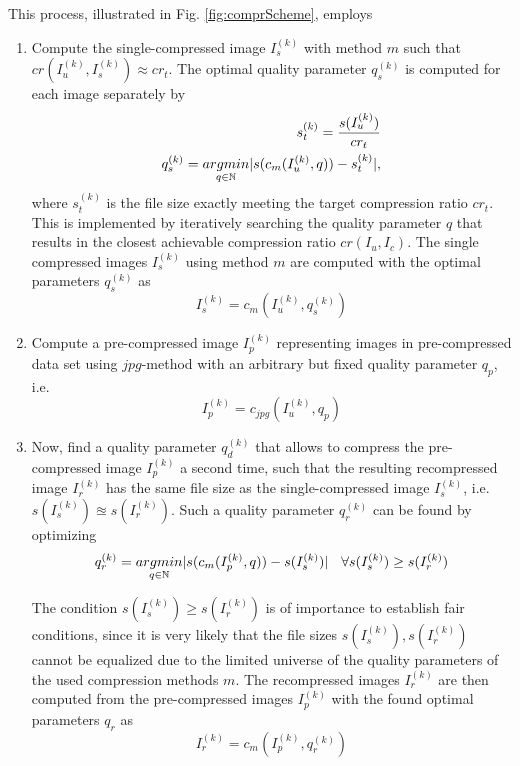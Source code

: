 \documentclass[10pt,twocolumn,letterpaper]{article}
\begin{document}
This process, illustrated in Fig. \ref{fig:comprScheme}, employs
\begin{enumerate}
	\item Compute the single-compressed image $I_s^{(k)}$ with method $m$ such that $cr(I_u^{(k)}, I_s^{(k)}) \approx cr_t$. The optimal quality parameter $q_s^{(k)}$ is computed for each image separately by
	\begin{eqnarray}
	\small
	s_t^{(k)} = \frac{s(I_u^{(k)})}{cr_t} \\
	q_s^{(k)} = \underset{q \in \mathbb{N}}{argmin}|s(c_m(I_u^{(k)},q)) - s_t^{(k)}|,
	\end{eqnarray} where $s_t^{(k)}$ is the file size exactly meeting the target compression ratio $cr_t$. This is implemented by iteratively searching the quality parameter $q$ that results in the closest achievable compression ratio $cr(I_u, I_c)$. The single compressed images $I_s^{(k)}$ using method $m$ are computed with the optimal parameters $ q_s^{(k)}$ as
	\begin{equation}
	I_s^{(k)} = c_m(I_u^{(k)}, q_s^{(k)})
	\end{equation}
	
	\item Compute a pre-compressed image $I_p^{(k)}$ representing images in pre-compressed data set using $jpg$-method \cite{jpg} with an arbitrary but fixed quality parameter $q_p$, i.e. 
	\begin{equation}
		I_p^{(k)} = c_{jpg}(I_u^{(k)}, q_p)
	\end{equation}
	
	\item Now, find a quality parameter $q_d^{(k)}$ that allows to compress the pre-compressed image $I_p^{(k)}$ a second time, such that the resulting recompressed image $I_r^{(k)}$ has the same file size as the single-compressed image $I_s^{(k)}$, i.e. $s(I_s^{(k)}) \approxeq s(I_r^{(k)})$. Such a quality parameter $q_r^{(k)}$ can be found by optimizing
	\begin{equation}
	\small
	q_r^{(k)} = \underset{q \in \mathbb{N}}{argmin}|s(c_m(I_p^{(k)},q)) - s(I_s^{(k)})| \quad \forall s(I_s^{(k)}) \geq s(I_r^{(k)})
	\label{equ:recomp}
	\end{equation}
	
	The condition $s(I_s^{(k)}) \geq s(I_r^{(k)})$ is of importance to establish fair conditions, since it is very likely that the file sizes $s(I_s^{(k)}), s(I_r^{(k)})$  cannot be equalized due to the limited universe of the quality parameters of the used compression methods $m$. The recompressed images $I_r^{(k)}$ are then computed from the pre-compressed images $I_p^{(k)}$ with the found optimal parameters $q_r$ as
	\begin{equation}
	I_r^{(k)} = c_m(I_p^{(k)}, q_r^{(k)})
	\end{equation}
\end{enumerate}
\end{document}
